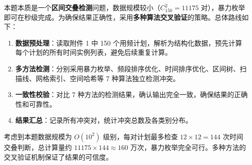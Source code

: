 
本题本质是一个\textbf{区间交叠检测}问题，数据规模较小（$C_{150}^{2} = 11175$ 对），暴力枚举即可在秒级完成。为确保结果正确性，采用\textbf{多种算法交叉验证}的策略。总体路线如下：

\begin{enumerate}
    \item \textbf{数据预处理}：读取附件 1 中 150 个用频计划，解析为结构化数据，预先计算每个计划的所有时间实例列表，避免后续重复计算。
    \item \textbf{多方法检测}：分别采用暴力枚举、频段排序优化、时间排序优化、区间树、扫描线、网格索引、空间哈希等 7 种算法独立检测冲突。
    \item \textbf{一致性校验}：对比 7 种方法的检测结果，确认输出完全一致，确保结果的正确性和可靠性。
    \item \textbf{结果汇总}：记录所有冲突对，统计冲突总数及各类别分布。
\end{enumerate}

考虑到本题数据规模为 $O(10^2)$ 级别，每对计划最多检查 $12 \times 12 = 144$ 次时间交叠判断，总计算量约 $11175 \times 144 \approx 160$ 万次，暴力枚举完全可行。多种方法的交叉验证机制保证了结果的可信度。

